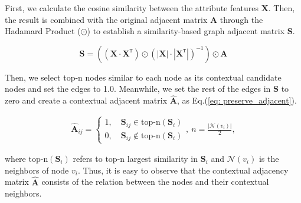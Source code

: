 \documentclass{article}
\begin{document}
First, we calculate the cosine similarity between the attribute features $\mathbf{X}$. 
Then, the result is combined with the original adjacent matrix $\mathbf{A}$ through the Hadamard Product ($\odot$) to establish a similarity-based graph adjacent matrix $\mathbf{S}$.

\begin{equation}
    \mathbf{S}= \left( ( \mathbf{X} \cdot \mathbf{X}^{\mathtt{T}})\odot (|\mathbf{X}| \cdot |\mathbf{X}^{\mathtt{T}}|)^{-1} \right) \odot \mathbf{A}
    \label{eq: sim_matrix}
\end{equation}


Then, we select top-n nodes similar to each node as its contextual candidate nodes and set the edges to 1.0. Meanwhile, we set the rest of the edges in $\mathbf{S}$ to zero and create a contextual adjacent matrix $\hat{\mathbf{A}}$, as Eq.(\ref{eq: preserve_adjacent}).


\begin{equation}
\begin{aligned}
\hat{\mathbf{A}}_{ij}=
    \begin{cases}
        1,\quad{{ \mathbf{S}}}_{ij}\in\text{top-n}({ \mathbf{S}}_{i})\\0, \quad{{\mathbf{S}}}_{ij}\notin\text{top-n}({{\mathbf{S}}}_{i})
    \end{cases}, ~ n = \frac{|\mathcal{N}(v_i)|}{2},
\end{aligned}
\label{eq: preserve_adjacent}
\end{equation}


where $\text{top-n}({ \mathbf{S}}_{i})$ refers to $\text{top-n}$ largest similarity in $ \mathbf{S}_i$ and $\mathcal{N}(v_i)$ is the neighbors of node $v_i$. Thus, it is easy to observe that the contextual adjacency matrix $\hat{\mathbf{A}}$ consists of the relation between the nodes and their contextual neighbors. 
\end{document}
